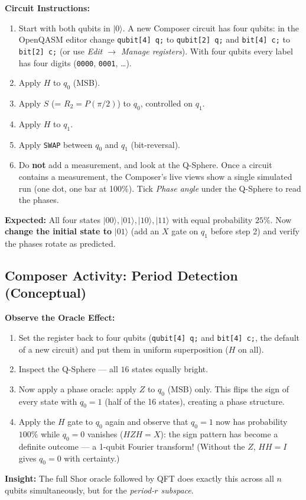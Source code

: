 \documentclass[a4paper,11pt]{article}
\providecommand{\ket}[1]{|#1\rangle}
\begin{document}
\begin{studentbox}
\textbf{Circuit Instructions:}
\begin{enumerate}
    \item Start with both qubits in $\ket{0}$. A new Composer circuit has four qubits: in the OpenQASM editor change \texttt{qubit[4] q;} to \texttt{qubit[2] q;} and \texttt{bit[4] c;} to \texttt{bit[2] c;} (or use \textit{Edit $\rightarrow$ Manage registers}). With four qubits every label has four digits (\texttt{0000}, \texttt{0001}, \ldots).
    \item Apply $H$ to $q_0$ (MSB).
    \item Apply $S$ (= $R_2 = P(\pi/2)$) to $q_0$, controlled on $q_1$.
    \item Apply $H$ to $q_1$.
    \item Apply \texttt{SWAP} between $q_0$ and $q_1$ (bit-reversal).
    \item Do \textbf{not} add a measurement, and look at the Q-Sphere. Once a circuit contains a measurement, the Composer's live views show a single simulated run (one dot, one bar at 100\%). Tick \textit{Phase angle} under the Q-Sphere to read the phases.
\end{enumerate}
\textbf{Expected:} All four states $\ket{00}, \ket{01}, \ket{10}, \ket{11}$
with equal probability $25\%$. Now \textbf{change the initial state to} $\ket{01}$
(add an $X$ gate on $q_1$ before step 2) and verify the phases rotate as predicted.
\end{studentbox}

\subsection{Composer Activity: Period Detection (Conceptual)}

\begin{studentbox}
\textbf{Observe the Oracle Effect:}
\begin{enumerate}
    \item Set the register back to four qubits (\texttt{qubit[4] q;} and \texttt{bit[4] c;}, the default of a new circuit) and put them in uniform superposition ($H$ on all).
    \item Inspect the Q-Sphere — all $16$ states equally bright.
    \item Now apply a phase oracle: apply $Z$ to $q_0$
    (MSB) only. This flips the sign of every state with $q_0 = 1$
    (half of the 16 states), creating a phase structure.
    \item Apply the $H$ gate to $q_0$ again and observe that
    $q_0 = 1$ now has probability $100\%$ while $q_0 = 0$ vanishes
    ($HZH = X$): the sign pattern has become a definite outcome ---
    a 1-qubit Fourier transform! (Without the $Z$, $HH = I$ gives
    $q_0 = 0$ with certainty.)
\end{enumerate}
\textbf{Insight:} The full Shor oracle followed by QFT does exactly this
across all $n$ qubits simultaneously, but for the \emph{period-$r$ subspace}.
\end{studentbox}
\end{document}
